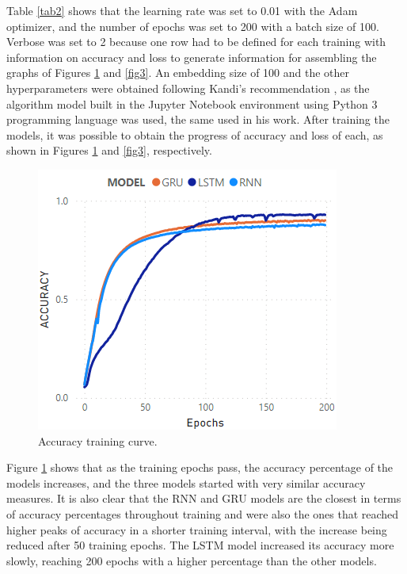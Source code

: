 \documentclass[conference]{IEEEtran}
\begin{document}
Table \ref{tab2} shows that the learning rate was set to 0.01 with the Adam optimizer, and the number of epochs was set to 200 with a batch size of 100. Verbose was set to 2 because one row had to be defined for each training with information on accuracy and loss \cite{b19} to generate information for assembling the graphs of Figures \ref{fig2} and \ref{fig3}. An embedding size of 100 and the other hyperparameters were obtained following Kandi’s recommendation \cite{b7}, as the algorithm model built in the Jupyter Notebook environment using Python 3 programming language was used, the same used in his work. After training the models, it was possible to obtain the progress of accuracy and loss of each, as shown in Figures \ref{fig2} and \ref{fig3}, respectively.

\begin{figure}[htbp]
\centerline{\includegraphics[scale=0.75]{images/acc.PNG}}
\caption{Accuracy training curve.}
\label{fig2}
\end{figure}

Figure \ref{fig2} shows that as the training epochs pass, the accuracy percentage of the models increases, and the three models started with very similar accuracy measures. It is also clear that the RNN and GRU models are the closest in terms of accuracy percentages throughout training and were also the ones that reached higher peaks of accuracy in a shorter training interval, with the increase being reduced after 50 training epochs. The LSTM model increased its accuracy more slowly, reaching 200 epochs with a higher percentage than the other models.
\end{document}
